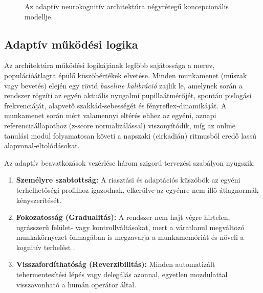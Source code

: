 \documentclass[12pt,a4paper,oneside]{book}
\begin{document}
\begin{figure}[H]
    \centering
    \caption{Az adaptív neurokognitív architektúra négyrétegű koncepcionális modellje.}
    \label{fig:conceptual_layers}
\end{figure}

\subsection{Adaptív működési logika}

Az architektúra működési logikájának legfőbb sajátossága a merev, populációátlagra épülő küszöbértékek elvetése. Minden munkamenet (műszak vagy bevetés) elején egy rövid \emph{baseline kalibráció} zajlik le, amelynek során a rendszer rögzíti az egyén aktuális nyugalmi pupillaátmérőjét, spontán pislogási frekvenciáját, alapvető szakkád-sebességét és fényreflex-dinamikáját. A munkamenet során mért valamennyi eltérés ehhez az egyéni, aznapi referenciaállapothoz (z-score normalizálással) viszonyítódik, míg az online tanulási modul folyamatosan követi a napszaki (cirkadián) ritmusból eredő lassú alapvonal-eltolódásokat.

Az adaptív beavatkozások vezérlése három szigorú tervezési szabályon nyugszik:
\begin{enumerate}
    \item \textbf{Személyre szabtottság:} A riasztási és adaptációs küszöbök az egyéni terhelhetőségi profilhoz igazodnak, elkerülve az egyénre nem illő átlagnormák kényszerítését.
    \item \textbf{Fokozatosság (Gradualitás):} A rendszer nem hajt végre hirtelen, ugrásszerű felület- vagy kontrollváltásokat, mert a váratlanul megváltozó munkakörnyezet önmagában is megzavarja a munkamemóriát és növeli a kognitív terhelést \cite{sweller2011}.
    \item \textbf{Visszafordíthatóság (Reverzibilitás):} Minden automatizált tehermentesítési lépés vagy delegálás azonnal, egyetlen mozdulattal visszavonható a humán operátor által.
\end{enumerate}
\end{document}
